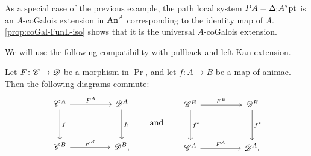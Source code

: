 \documentclass[english,svgnames,table]{article}
\begin{document}
    \begin{example}
    \label{exm:universal-coGalois}
        As a special case of the previous example, the path local system $P A = \Delta_! A^* \mathrm{pt}$ is an $A$-coGalois extension in $\mathrm{An}^A$ corresponding to the identity map of $A$. 
        \cref{prop:coGal-FunL-iso} shows that it is the universal $A$-coGalois extension.
    \end{example}

    We will use the following compatibility with pullback and left Kan extension.

    \begin{lemma}
    \label{lem:lower-shriek-functoriality}
        Let $F \colon \mathscr{C} \to \mathscr{D}$ be a morphism in $\Pr$, and let $f \colon A \to B$ be a map of animae. Then the following diagrams commute:
        \begin{equation*}
            \begin{tikzcd}
                {\cC^A} && {\cD^A} \\
                \\
                {\cC^B} && {\cD^B,}
                \arrow["F^A", from=1-1, to=1-3]
                \arrow["{f_!}", from=1-1, to=3-1]
                \arrow["{f_!}", from=1-3, to=3-3]
                \arrow["F^B", from=3-1, to=3-3]
            \end{tikzcd}
            \qand
            \begin{tikzcd}
                {\cC^B} && {\cD^B} \\
                \\
                {\cC^A} && {\cD^A.}
                \arrow["F^B", from=1-1, to=1-3]
                \arrow["{f^*}", from=1-1, to=3-1]
                \arrow["{f^*}", from=1-3, to=3-3]
                \arrow["F^A", from=3-1, to=3-3]
            \end{tikzcd}
        \end{equation*}
    \end{lemma}
\end{document}
